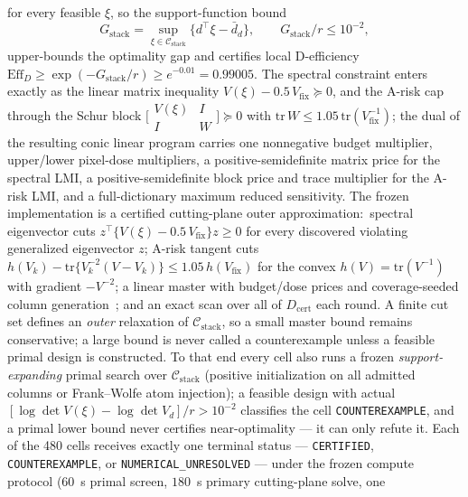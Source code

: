 \documentclass[10pt]{article}
\begin{document}
for every feasible $\xi$, so the support-function bound
\begin{equation}
  G_{\mathrm{stack}} = \sup_{\xi\in\mathcal{C}_{\mathrm{stack}}}
  \bigl\{d^{\top}\xi - \bar d_d\bigr\},
  \qquad G_{\mathrm{stack}}/r \le 10^{-2},
  \label{eq:s-relkw}
\end{equation}
upper-bounds the optimality gap and certifies local D-efficiency
$\mathrm{Eff}_D \ge \exp(-G_{\mathrm{stack}}/r) \ge e^{-0.01} = 0.99005$.
The spectral constraint enters exactly as the linear matrix inequality
$V(\xi) - 0.5\,V_{\mathrm{fix}} \succeq 0$, and the A-risk cap through the
Schur block
$\bigl[\begin{smallmatrix} V(\xi) & I \\ I & W \end{smallmatrix}\bigr]
\succeq 0$ with $\mathrm{tr}\,W \le 1.05\,\mathrm{tr}
(V_{\mathrm{fix}}^{-1})$; the dual of the resulting conic linear program
carries one nonnegative budget multiplier, upper/lower pixel-dose
multipliers, a positive-semidefinite matrix price for the spectral LMI, a
positive-semidefinite block price and trace multiplier for the A-risk LMI,
and a full-dictionary maximum reduced sensitivity. The frozen implementation
is a certified cutting-plane outer approximation:\ spectral eigenvector cuts
$z^{\top}\{V(\xi) - 0.5\,V_{\mathrm{fix}}\}z \ge 0$ for every discovered
violating generalized eigenvector $z$; A-risk tangent cuts
$h(V_k) - \mathrm{tr}\{V_k^{-2}(V - V_k)\} \le 1.05\,h(V_{\mathrm{fix}})$
for the convex $h(V) = \mathrm{tr}(V^{-1})$ with gradient $-V^{-2}$; a
linear master with budget/dose prices and coverage-seeded column
generation~\cite{jaggi2013frankwolfe}; and an exact scan over all of
$D_{\mathrm{cert}}$ each round. A finite cut set defines an \emph{outer}
relaxation of $\mathcal{C}_{\mathrm{stack}}$, so a small master bound
remains conservative; a large bound is never called a counterexample unless
a feasible primal design is constructed. To that end every cell also runs a
frozen \emph{support-expanding} primal search over
$\mathcal{C}_{\mathrm{stack}}$ (positive initialization on all admitted
columns or Frank--Wolfe atom injection); a feasible design with actual
$[\log\det V(\xi) - \log\det V_d]/r > 10^{-2}$ classifies the cell
\texttt{COUNTEREXAMPLE}, and a primal lower bound never certifies
near-optimality --- it can only refute it. Each of the 480 cells receives
exactly one terminal status --- \texttt{CERTIFIED}, \texttt{COUNTEREXAMPLE},
or \texttt{NUMERICAL\_UNRESOLVED} --- under the frozen compute protocol
($60$~s primal screen, $180$~s primary cutting-plane solve, one
\end{document}
